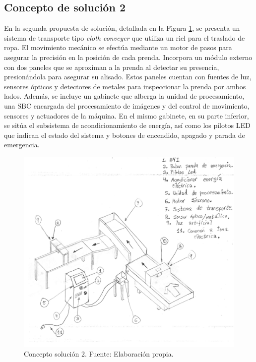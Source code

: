 \subsection{Concepto de solución 2}

En la segunda propuesta de solución, detallada en la Figura \ref{fig:sketch_CS_2}, se presenta un sistema de transporte tipo \textit{cloth conveyer} que utiliza un riel para el traslado de ropa. El movimiento mecánico se efectúa mediante un motor de pasos para asegurar la precisión en la posición de cada prenda. Incorpora un módulo externo con dos paneles que se aproximan a la prenda al detectar su presencia, presionándola para asegurar su alisado. Estos paneles cuentan con fuentes de luz, sensores ópticos y detectores de metales para inspeccionar la prenda por ambos lados. Además, se incluye un gabinete que alberga la unidad de procesamiento, una SBC encargada del procesamiento de imágenes y del control de movimiento, sensores y actuadores de la máquina. En el mismo gabinete, en su parte inferior, se sitúa el subsistema de acondicionamiento de energía, así como los pilotos LED que indican el estado del sistema y botones de encendido, apagado y parada de emergencia.

\begin{figure}[H]
	\centering
	\includegraphics[page=2,width=\textwidth]{img/sketch_CS.pdf}
	\caption[Concepto solución 2.]{Concepto solución 2. Fuente: Elaboración propia.}
	\label{fig:sketch_CS_2}
\end{figure}

